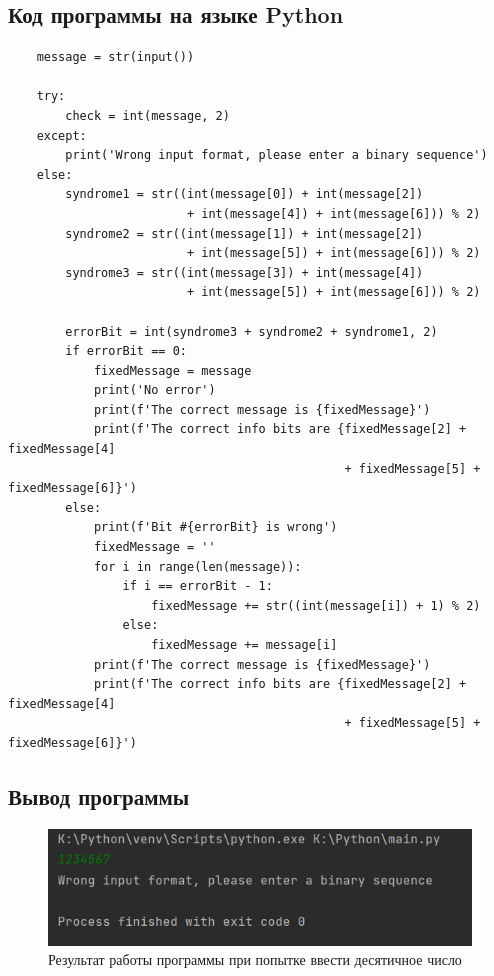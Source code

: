 \documentclass[12pt]{article}
\begin{document}
\subsection{Код программы на языке Python}
\begin{verbatim}
    message = str(input())
    
    try:
        check = int(message, 2)
    except:
        print('Wrong input format, please enter a binary sequence')
    else:
        syndrome1 = str((int(message[0]) + int(message[2])
                         + int(message[4]) + int(message[6])) % 2)
        syndrome2 = str((int(message[1]) + int(message[2])
                         + int(message[5]) + int(message[6])) % 2)
        syndrome3 = str((int(message[3]) + int(message[4])
                         + int(message[5]) + int(message[6])) % 2)
                         
        errorBit = int(syndrome3 + syndrome2 + syndrome1, 2)
        if errorBit == 0:
            fixedMessage = message
            print('No error')
            print(f'The correct message is {fixedMessage}')
            print(f'The correct info bits are {fixedMessage[2] + fixedMessage[4]
                                               + fixedMessage[5] + fixedMessage[6]}')
        else:
            print(f'Bit #{errorBit} is wrong')
            fixedMessage = ''
            for i in range(len(message)):
                if i == errorBit - 1:
                    fixedMessage += str((int(message[i]) + 1) % 2)
                else:
                    fixedMessage += message[i]
            print(f'The correct message is {fixedMessage}')
            print(f'The correct info bits are {fixedMessage[2] + fixedMessage[4]
                                               + fixedMessage[5] + fixedMessage[6]}')
\end{verbatim}

\newpage

\subsection{Вывод программы}

\begin{figure}[h]
    \centering
    \includegraphics[width=0.92\linewidth]{img/image4.png}
    \caption{Результат работы программы при попытке ввести десятичное число}
\end{figure}
\end{document}
